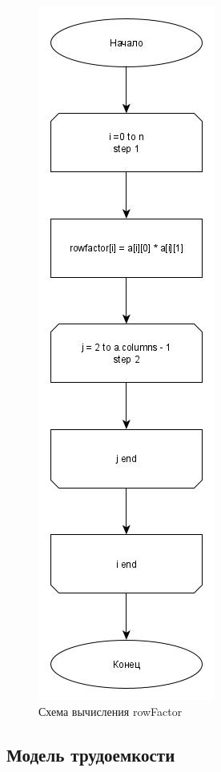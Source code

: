 \documentclass[a4paper, 14pt]{article}
\begin{document}
	\vspace{1cm}
	\newpage
	\begin{figure}[H]
		\centering
		\includegraphics[scale=0.5]{Схемы/rowfactor}
		\caption{Схема вычисления rowFactor}
		\label{fig:rowfactor}
	\end{figure}


	\subsection{Модель трудоемкости}
	
\end{document}
